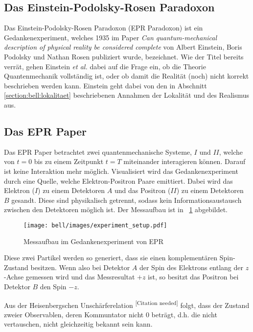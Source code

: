 \begin{refsection}
\section{Das Einstein-Podolsky-Rosen Paradoxon}
Das Einstein-Podolsky-Rosen Paradoxon (EPR Paradoxon) ist ein 
Gedankenexperiment, welches 1935 im Paper \cite{Einstein1935}
\emph{Can quantum-mechanical description of physical reality be considered complete}
von Albert Einstein, Boris Podolsky und Nathan Rosen publiziert wurde,
bezeichnet.
Wie der Titel bereits verr\"at, gehen Einstein \emph{et al.} dabei auf
die Frage ein, ob die Theorie Quantenmechanik vollständig ist, oder
ob damit die Realit\"at (noch) nicht korrekt beschrieben werden kann.
Einstein geht dabei von den in Abschnitt \ref{section:bell:lokalitaet}
beschriebenen Annahmen der Lokalit\"at und des Realismus aus.

\subsection{Das EPR Paper}
Das EPR Paper betrachtet zwei quantenmechanische Systeme, $I$ und $II$,
welche von $t=0$ bis zu einem Zeitpunkt $t=T$ miteinander 
interagieren k\"onnen. Darauf ist keine Interaktion mehr m\"oglich.
Visualisiert wird das Gedankenexperiment durch eine Quelle, welche
Elektron-Positron Paare emittiert. 
Dabei wird das Elektron ($I$) zu einem Detektoren $A$ und das 
Positron ($II$) zu einem Detektoren $B$ gesandt.
Diese sind physikalisch getrennt, sodass kein Informationsaustausch
zwischen den Detektoren m\"oglich ist.
Der Messaufbau ist in \figurename~\ref{fig:bell:EPR_Messaufbau} abgebildet.

\begin{figure}
    \centering
    \texttt{[image: bell/images/experiment\_setup.pdf]}
    \caption{Messaufbau im Gedankenexperiment von EPR}
    \label{fig:bell:EPR_Messaufbau}
\end{figure}

Diese zwei Partikel werden so generiert, dass sie einen komplement\"aren
Spin-Zustand besitzen. 
Wenn also bei Detektor $A$ der Spin des Elektrons entlang der $z$-Achse
gemessen wird und das Messresultat $+z$ ist, so besitzt das Positron bei
Detektor $B$ den Spin $-z$.

Aus der Heisenbergschen Unsch\"arferelation
\textsuperscript{[Citation needed]}
folgt, dass der Zustand zweier Observablen, deren Kommuntator
nicht $0$ betr\"agt, d.h. die nicht vertauschen, nicht gleichzeitig
bekannt sein kann.


\end{refsection}
